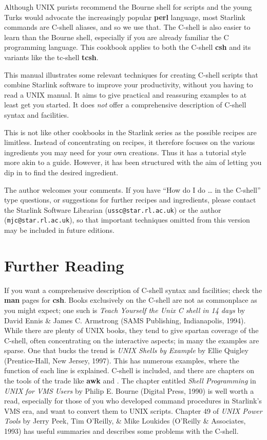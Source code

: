 Although UNIX purists recommend the Bourne shell for scripts and the
young Turks would advocate the increasingly popular {\bf perl}
language, most Starlink commands are C-shell aliases, and so we use
that.  The C-shell is also easier to learn than the Bourne shell,
especially if you are already familiar the C programming language.
This cookbook applies to both the C-shell {\bf csh} and its variants
like the tc-shell {\bf tcsh}.

This manual illustrates some relevant techniques for creating C-shell
scripts that combine Starlink software to improve your productivity,
without you having to read a UNIX manual.  It aims to give practical and
reassuring examples to at least get you started.  It does {\em not\/}
offer a comprehensive description of C-shell syntax and facilities.

This is not like other cookbooks in the Starlink series as the
possible recipes are limitless.  Instead of concentrating on recipes,
it therefore focuses on the various ingredients you may need for your
own creations.  Thus it has a tutorial style more akin to a guide.
However, it has been structured with the aim of letting you dip in to
find the desired ingredient.

The author welcomes your comments.  If you have ``How do I do \ldots
in the C-shell'' type questions, or suggestions for further recipes
and ingredients, please contact the Starlink Software Librarian
({\tt{ussc@star.rl.ac.uk}}) or the author ({\tt{mjc@star.rl.ac.uk}}), so that
important techniques omitted from this version may be included in future
editions.

\section{Further Reading}

If you want a comprehensive description of C-shell syntax and
facilities; check the {\bf man} pages for {\bf csh}.  Books
exclusively on the C-shell are not as commonplace as you might expect;
one such is {\sl Teach Yourself the Unix C shell in 14 days} by David
Ennis \& James C. Armstrong (SAMS Publishing, Indianapolis, 1994).
While there are plenty of UNIX books, they tend to give spartan
coverage of the C-shell, often concentrating on the interactive
aspects; in many the examples are sparse.  One that bucks the trend is
{\sl UNIX Shells by Example} by Ellie Quigley (Prentice-Hall, New
Jersey, 1997).  This has numerous examples, where the function of each
line is explained.  C-shell is included, and there are chapters on the
tools of the trade like {\bf awk} and .  The chapter entitled {\it Shell
Programming\/} in {\sl UNIX for VMS Users\/} by Philip E. Bourne
(Digital Press, 1990) is well worth a read, especially for those of
you who developed command procedures in Starlink's VMS era, and want
to convert them to UNIX scripts.  Chapter 49 of {\sl UNIX Power Tools}
by Jerry Peek, Tim O'Reilly, \& Mike Loukides (O'Reilly \& Associates,
1993) has useful summaries and describes some problems with the
C-shell.

